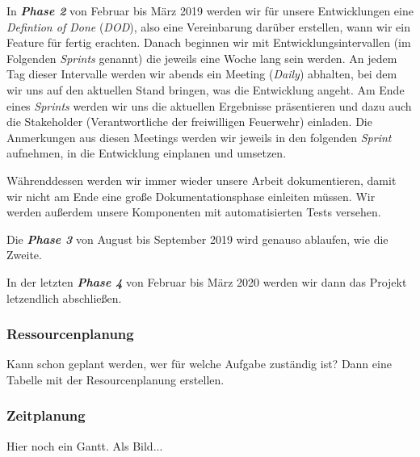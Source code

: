 In \textit{\textbf{Phase 2}} von Februar bis März 2019 werden wir für unsere Entwicklungen eine \textit{Defintion of Done} (\textit{DOD}), also eine Vereinbarung darüber erstellen, wann wir ein Feature für fertig erachten. Danach beginnen wir mit Entwicklungsintervallen (im Folgenden \textit{Sprints }genannt) die jeweils eine Woche lang sein werden. An jedem Tag dieser Intervalle werden wir abends ein Meeting (\textit{Daily}) abhalten, bei dem wir uns auf den aktuellen Stand bringen, was die Entwicklung angeht. Am Ende eines \textit{Sprints} werden wir uns die aktuellen Ergebnisse präsentieren und dazu auch die Stakeholder (Verantwortliche der freiwilligen Feuerwehr) einladen. Die Anmerkungen aus diesen Meetings werden wir jeweils in den folgenden \textit{Sprint} aufnehmen, in die Entwicklung einplanen und umsetzen. 

Währenddessen werden wir immer wieder unsere Arbeit dokumentieren, damit wir nicht am Ende eine große Dokumentationsphase einleiten müssen. Wir werden außerdem unsere Komponenten mit automatisierten Tests versehen.

Die \textit{\textbf{Phase 3}} von August bis September 2019 wird genauso ablaufen, wie die Zweite.

In der letzten \textit{\textbf{Phase 4}} von Februar bis März 2020 werden wir dann das Projekt letzendlich abschließen.  

\subsubsection{Ressourcenplanung}

Kann schon geplant werden, wer für welche Aufgabe zuständig ist? Dann eine Tabelle mit der Resourcenplanung erstellen.

\subsubsection{Zeitplanung}

Hier noch ein Gantt. Als Bild...